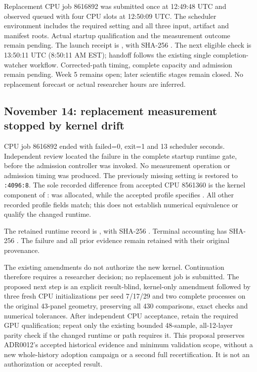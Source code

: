 Replacement CPU job 8616892 was submitted once at 12:49:48 UTC and observed
queued with four CPU slots at 12:50:09 UTC. The scheduler environment includes
the required setting and all three input, artifact and manifest roots.
Actual startup qualification and the measurement outcome remain pending.
The launch receipt is
,
with SHA-256
.
The next eligible check is 13:50:11 UTC (8:50:11 AM EST); handoff follows the
existing single completion-watcher workflow. Corrected-path timing, complete
capacity and admission remain pending. Week 5 remains open; later scientific
stages remain closed. No replacement forecast or actual researcher hours are
inferred.

\subsection*{November 14: replacement measurement stopped by kernel drift}

CPU job 8616892 ended with failed=0, exit=1 and 13 scheduler seconds.
Independent review located the failure in the complete startup runtime gate,
before the admission controller was invoked. No measurement operation or
admission timing was produced. The previously missing
 setting is restored to \texttt{:4096:8}.
The sole recorded difference from accepted CPU 8561360 is the kernel component
of :  was allocated,
while the accepted profile specifies .
All other recorded profile fields match; this does not establish numerical
equivalence or qualify the changed runtime.

The retained runtime record is
,
with SHA-256
.
Terminal accounting has SHA-256
.
The failure and all prior evidence remain retained with their original provenance.

The existing amendments do not authorize the new kernel. Continuation therefore
requires a researcher decision; no replacement job is submitted. The proposed
next step is an explicit result-blind, kernel-only amendment followed by three
fresh CPU initializations per seed 7/17/29 and two complete processes on the
original 43-panel geometry, preserving all 430 comparisons, exact checks and
numerical tolerances. After independent CPU acceptance, retain the required GPU
qualification; repeat only the existing bounded 48-sample, all-12-layer parity
check if the changed runtime or path requires it.
This proposal preserves ADR0012's accepted historical evidence and minimum
validation scope, without a new whole-history adoption campaign or a second full
recertification. It is not an authorization or accepted result.


